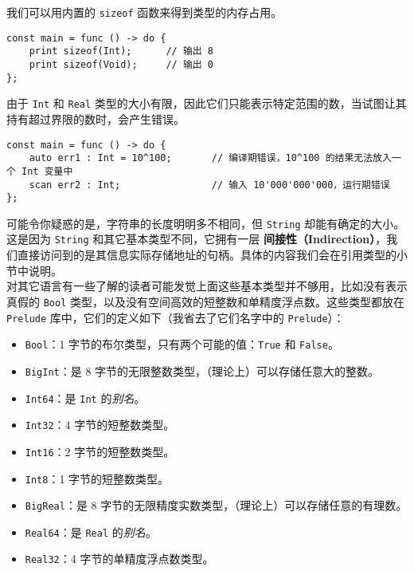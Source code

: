 我们可以用内置的 \lstinline!sizeof! 函数来得到类型的内存占用。

\begin{lstlisting}
const main = func () -> do {
    print sizeof(Int);      // 输出 8
    print sizeof(Void);     // 输出 0
};
\end{lstlisting}

由于 \lstinline!Int! 和 \lstinline!Real! 类型的大小有限，因此它们只能表示特定范围的数，当试图让其持有超过界限的数时，会产生错误。

\begin{lstlisting}
const main = func () -> do {
    auto err1 : Int = 10^100;       // 编译期错误，10^100 的结果无法放入一个 Int 变量中
    scan err2 : Int;                // 输入 10'000'000'000，运行期错误
};
\end{lstlisting}

可能令你疑惑的是，字符串的长度明明多不相同，但 \lstinline!String! 却能有确定的大小。这是因为 \lstinline!String! 和其它基本类型不同，它拥有一层 \textbf{间接性（Indirection）}，我们直接访问到的是其信息实际存储地址的句柄。具体的内容我们会在引用类型的小节中说明。 \\

对其它语言有一些了解的读者可能发觉上面这些基本类型并不够用，比如没有表示真假的 \lstinline!Bool! 类型，以及没有空间高效的短整数和单精度浮点数。这些类型都放在 \lstinline!Prelude! 库中，它们的定义如下（我省去了它们名字中的 \lstinline!Prelude!）：

\begin{itemize}
    \item \lstinline!Bool!：1 字节的布尔类型，只有两个可能的值：\lstinline!True! 和 \lstinline!False!。
    \item \lstinline!BigInt!：是 8 字节的无限整数类型，（理论上）可以存储任意大的整数。
    \item \lstinline!Int64!：是 \lstinline!Int! 的\emph{别名}。
    \item \lstinline!Int32!：4 字节的短整数类型。
    \item \lstinline!Int16!：2 字节的短整数类型。
    \item \lstinline!Int8!：1 字节的短整数类型。
    \item \lstinline!BigReal!：是 8 字节的无限精度实数类型，（理论上）可以存储任意的有理数。
    \item \lstinline!Real64!：是 \lstinline!Real! 的\emph{别名}。
    \item \lstinline!Real32!：4 字节的单精度浮点数类型。
\end{itemize}

